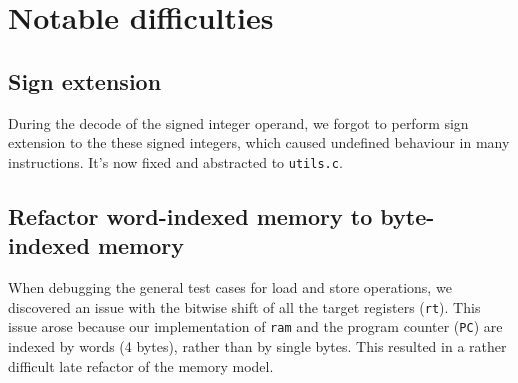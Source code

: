 \documentclass[11pt]{article}
\begin{document}
\section{Notable difficulties}

\subsection{Sign extension}
During the decode of the signed integer operand, we forgot to perform sign
extension to the these signed integers, which caused undefined behaviour in
many instructions. It's now fixed and abstracted to \texttt{utils.c}.

\subsection{Refactor word-indexed memory to byte-indexed memory}
When debugging the general test cases for load and store operations, we
discovered an issue with the bitwise shift of all the target registers
(\texttt{rt}). This issue arose because our implementation of \texttt{ram} and
the program counter (\texttt{PC}) are indexed by words (4 bytes), rather than
by single bytes. This resulted in a rather difficult late refactor of the
memory model.
\end{document}
